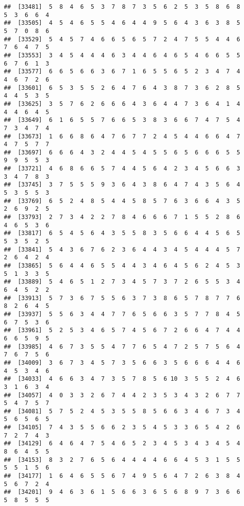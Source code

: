 \documentclass[
]{book}
\begin{document}
\begin{verbatim}
##  [33481]  5  8  4  6  5  3  7  8  7  3  5  6  2  5  3  5  8  6  8  5  3  6  6  4
##  [33505]  4  5  4  6  5  5  4  6  4  4  9  5  6  4  3  6  3  8  5  5  7  0  8  6
##  [33529]  5  4  5  7  4  6  6  5  6  5  7  2  4  7  5  5  4  4  6  7  6  4  7  5
##  [33553]  3  4  5  4  4  4  6  3  4  4  6  4  6  5  4  6  6  5  5  6  7  6  1  3
##  [33577]  6  6  5  6  6  3  6  7  1  6  5  5  6  5  2  3  4  7  4  4  6  7  2  6
##  [33601]  6  5  3  5  5  2  6  4  7  6  4  3  8  7  3  6  2  8  5  4  4  5  3  5
##  [33625]  3  5  7  6  2  6  6  6  4  3  6  4  4  7  3  6  4  1  4  4  4  6  4  5
##  [33649]  6  1  6  5  5  7  6  6  5  3  8  3  6  6  7  4  7  5  4  7  3  4  7  4
##  [33673]  1  6  6  8  6  4  7  6  7  7  2  4  5  4  4  6  6  4  7  4  7  5  7  7
##  [33697]  6  6  6  4  3  2  4  4  5  4  5  5  6  5  6  6  6  5  5  9  9  5  5  3
##  [33721]  4  6  8  6  6  5  7  4  4  5  6  4  2  3  4  5  6  6  3  3  4  7  8  3
##  [33745]  3  7  5  5  5  9  3  6  4  3  8  6  4  7  4  3  5  6  4  5  3  5  5  3
##  [33769]  6  5  2  4  8  5  4  4  5  8  5  7  6  3  6  6  4  3  5  2  6  9  2  5
##  [33793]  2  7  3  4  2  2  7  8  4  6  6  6  7  1  5  5  2  8  6  4  6  5  3  6
##  [33817]  6  5  4  5  6  4  3  5  5  8  3  5  6  6  4  4  5  6  5  5  3  5  2  5
##  [33841]  5  4  3  6  7  6  2  3  6  4  4  3  4  5  4  4  4  5  7  2  6  4  2  4
##  [33865]  5  6  4  4  6  5  5  4  4  3  4  6  4  5  6  2  4  5  3  5  1  3  3  5
##  [33889]  5  4  6  5  1  2  7  3  4  5  7  3  7  2  6  5  5  3  4  6  4  5  2  2
##  [33913]  5  7  3  6  7  5  5  6  3  7  3  8  6  5  7  8  7  7  6  8  2  6  4  5
##  [33937]  5  5  6  3  4  4  7  7  6  5  6  6  3  5  7  7  8  4  5  6  7  5  3  6
##  [33961]  5  2  5  3  4  6  5  7  4  5  6  7  2  6  6  4  7  4  4  6  6  5  9  5
##  [33985]  4  6  7  3  5  5  4  7  7  6  5  4  7  2  5  7  5  6  4  7  6  7  5  6
##  [34009]  3  6  7  3  4  5  7  3  5  6  6  3  5  6  6  6  4  4  6  4  5  3  4  6
##  [34033]  4  6  6  3  4  7  3  5  7  8  5  6 10  3  5  5  2  4  6  3  1  6  3  4
##  [34057]  4  0  3  3  2  6  7  4  4  2  3  5  3  4  3  2  6  7  7  5  4  7  5  7
##  [34081]  5  7  5  2  4  5  3  5  5  8  5  6  6  3  4  6  7  3  4  5  6  5  6  5
##  [34105]  7  4  3  5  5  6  6  2  3  5  4  5  3  3  6  5  4  2  6  7  2  7  4  3
##  [34129]  6  4  6  4  7  5  4  6  5  2  3  4  5  3  4  3  4  5  4  8  6  4  5  5
##  [34153]  8  3  2  7  6  5  6  4  4  4  4  6  6  4  5  3  1  5  5  5  5  1  5  6
##  [34177]  1  6  4  6  5  5  6  7  4  9  5  6  4  7  2  6  3  8  4  5  6  7  2  4
##  [34201]  9  4  6  3  6  1  5  6  6  3  6  5  6  8  9  7  3  6  6  5  8  5  5  5

\end{verbatim}
\end{document}
